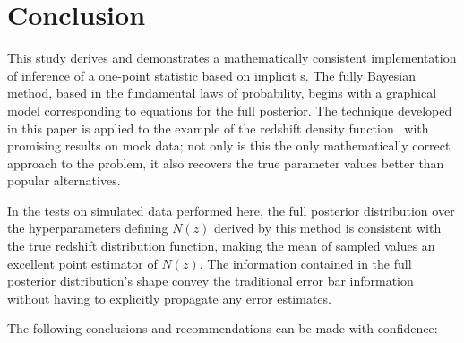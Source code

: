 \section{Conclusion}


This study derives and demonstrates a mathematically consistent implementation of inference of a one-point statistic based on implicit \pzpdf s.  
The fully Bayesian method, based in the fundamental laws of probability, begins with a graphical model corresponding to equations for the full posterior.  
The technique developed in this paper is applied to the example of the redshift density function \nz\ with promising results on mock data; not only is this the only mathematically correct approach to the problem, it also recovers the true parameter values better than popular alternatives.  

In the tests on simulated data performed here, the full posterior distribution over the hyperparameters defining $N(z)$ derived by this method is consistent with the true redshift distribution function, making the mean of sampled values an excellent point estimator of $N(z)$.  
The information contained in the full posterior distribution's shape convey the traditional error bar information without having to explicitly propagate any error estimates.  

The following conclusions and recommendations can be made with confidence:

